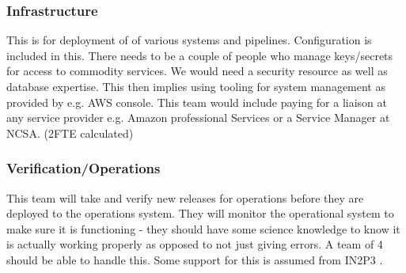 \subsubsection{Infrastructure } \label{ses:infra}
This is for deployment of of various systems and pipelines. Configuration is included in this. There needs to be a couple of people who manage keys/secrets
for access to commodity services. We would need a security resource as well as database expertise.  This then implies using tooling for system management as
provided by e.g. AWS console.
This team would include paying for a liaison at any service provider e.g. Amazon professional Services or a Service Manager at NCSA. (2FTE calculated)

\subsubsection{Verification/Operations }
This team will take and verify new releases for operations before they are deployed to the operations system. They will monitor the operational system to make sure it is functioning - they should have some science knowledge to know it is actually working properly as opposed to not just giving errors. A team of 4 should be able to handle this.
Some support for this is assumed from IN2P3 .
